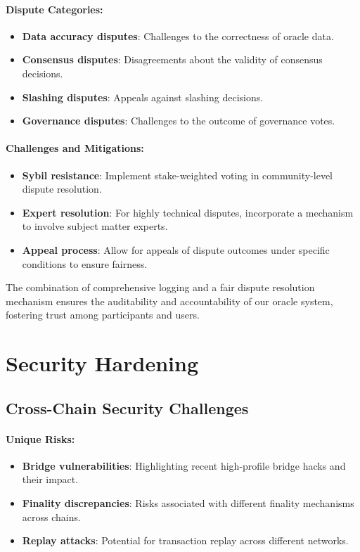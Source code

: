 \documentclass[12pt,a4paper]{article}
\begin{document}
	\paragraph{Dispute Categories:}
	\begin{itemize}
		\item \textbf{Data accuracy disputes}: Challenges to the correctness of oracle data.
		\item \textbf{Consensus disputes}: Disagreements about the validity of consensus decisions.
		\item \textbf{Slashing disputes}: Appeals against slashing decisions.
		\item \textbf{Governance disputes}: Challenges to the outcome of governance votes.
	\end{itemize}
	
	\paragraph{Challenges and Mitigations:}
	\begin{itemize}
		\item \textbf{Sybil resistance}: Implement stake-weighted voting in community-level dispute resolution.
		\item \textbf{Expert resolution}: For highly technical disputes, incorporate a mechanism to involve subject matter experts.
		\item \textbf{Appeal process}: Allow for appeals of dispute outcomes under specific conditions to ensure fairness.
	\end{itemize}
	
	The combination of comprehensive logging and a fair dispute resolution mechanism ensures the auditability and accountability of our oracle system, fostering trust among participants and users.
	
\section{Security Hardening}

\subsection{Cross-Chain Security Challenges}
\paragraph{Unique Risks:}
\begin{itemize}
	\item \textbf{Bridge vulnerabilities}: Highlighting recent high-profile bridge hacks and their impact.
	\item \textbf{Finality discrepancies}: Risks associated with different finality mechanisms across chains.
	\item \textbf{Replay attacks}: Potential for transaction replay across different networks.
\end{itemize}
\end{document}
